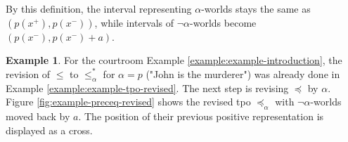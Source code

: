 \documentclass[english, 12pt]{scrartcl}
\theoremstyle{definition}
\newtheorem{example}{Example}
\theoremstyle{definition}
\theoremstyle{definition}
\begin{document}
By this definition, the interval representing $\alpha$-worlds stays the same as $(p(x^{+}), p(x^{-}))$, while intervals of $\neg\alpha$-worlds become $(p(x^{-}), p(x^{-}) + a)$.

\begin{example}
    \label{example:example-preceq-revised}
    For the courtroom Example \ref{example:example-introduction}, the revision of $\leq$ to $\leq_{\alpha}^{\ast}$ for $\alpha = p$ ("John is the murderer") was already done in Example \ref{example:example-tpo-revised}. The next step is revising $\preceq$ by $\alpha$. Figure \ref{fig:example-preceq-revised} shows the revised tpo $\preceq_{\alpha}$ with $\neg\alpha$-worlds moved back by $a$. The position of their previous positive representation is displayed as a cross.
    
    \begin{figure}[H]
            \centering
\end{figure}
\end{example}
\end{document}
